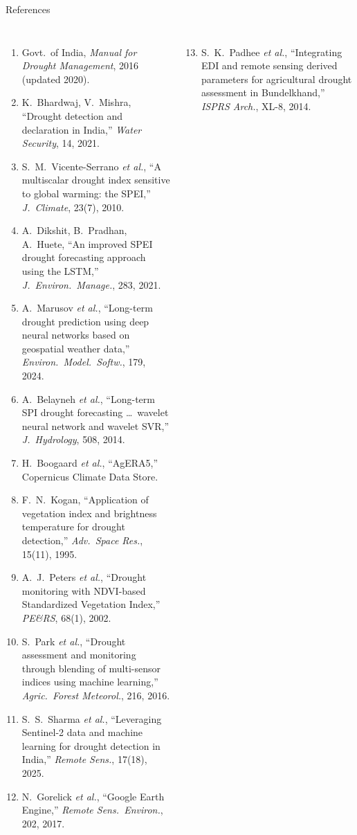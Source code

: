 \documentclass[aspectratio=169,10pt]{beamer}
\begin{document}
\begin{frame}{References}
\tiny
\begin{columns}[T]
\begin{enumerate}\setlength{\itemsep}{1.5pt}
\item Govt.\ of India, \emph{Manual for Drought Management}, 2016 (updated 2020).
\item K.~Bhardwaj, V.~Mishra, ``Drought detection and declaration in India,'' \emph{Water Security}, 14, 2021.
\item S.~M.~Vicente-Serrano \emph{et al.}, ``A multiscalar drought index sensitive to global warming: the SPEI,'' \emph{J.\ Climate}, 23(7), 2010.
\item A.~Dikshit, B.~Pradhan, A.~Huete, ``An improved SPEI drought forecasting approach using the LSTM,'' \emph{J.\ Environ.\ Manage.}, 283, 2021.
\item A.~Marusov \emph{et al.}, ``Long-term drought prediction using deep neural networks based on geospatial weather data,'' \emph{Environ.\ Model.\ Softw.}, 179, 2024.
\item A.~Belayneh \emph{et al.}, ``Long-term SPI drought forecasting \ldots\ wavelet neural network and wavelet SVR,'' \emph{J.\ Hydrology}, 508, 2014.
\item H.~Boogaard \emph{et al.}, ``AgERA5,'' Copernicus Climate Data Store.
\item F.~N.~Kogan, ``Application of vegetation index and brightness temperature for drought detection,'' \emph{Adv.\ Space Res.}, 15(11), 1995.
\item A.~J.~Peters \emph{et al.}, ``Drought monitoring with NDVI-based Standardized Vegetation Index,'' \emph{PE\&RS}, 68(1), 2002.
\item S.~Park \emph{et al.}, ``Drought assessment and monitoring through blending of multi-sensor indices using machine learning,'' \emph{Agric.\ Forest Meteorol.}, 216, 2016.
\item S.~S.~Sharma \emph{et al.}, ``Leveraging Sentinel-2 data and machine learning for drought detection in India,'' \emph{Remote Sens.}, 17(18), 2025.
\item N.~Gorelick \emph{et al.}, ``Google Earth Engine,'' \emph{Remote Sens.\ Environ.}, 202, 2017.
\end{enumerate}
\begin{enumerate}\setcounter{enumi}{12}\setlength{\itemsep}{1.5pt}
\item S.~K.~Padhee \emph{et al.}, ``Integrating EDI and remote sensing derived parameters for agricultural drought assessment in Bundelkhand,'' \emph{ISPRS Arch.}, XL-8, 2014.

\end{enumerate}
\end{columns}
\end{frame}
\end{document}
